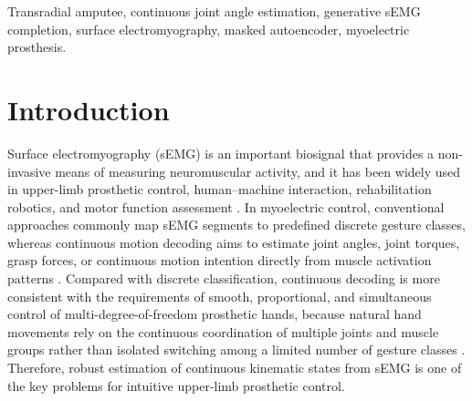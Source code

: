 \documentclass[journal]{IEEEtran}
\begin{document}
\begin{IEEEkeywords}
Transradial amputee, continuous joint angle estimation, generative sEMG completion, surface electromyography, masked autoencoder, myoelectric prosthesis.
\end{IEEEkeywords}

\IEEEpeerreviewmaketitle

\section{Introduction}

Surface electromyography (sEMG) is an important biosignal that provides a non-invasive means of measuring neuromuscular activity, and it has been widely used in upper-limb prosthetic control, human--machine interaction, rehabilitation robotics, and motor function assessment \cite{Zhong2026DeepFeature,Hudgins1993Strategy,Cipriani2011Online,Wei2024Continuous}. In myoelectric control, conventional approaches commonly map sEMG segments to predefined discrete gesture classes, whereas continuous motion decoding aims to estimate joint angles, joint torques, grasp forces, or continuous motion intention directly from muscle activation patterns \cite{Jiang2014Mapping,Jiang2014Intuitive,Zhang2020Simultaneous,Krasoulis2015Evaluation}. Compared with discrete classification, continuous decoding is more consistent with the requirements of smooth, proportional, and simultaneous control of multi-degree-of-freedom prosthetic hands, because natural hand movements rely on the continuous coordination of multiple joints and muscle groups rather than isolated switching among a limited number of gesture classes \cite{Jiang2014Intuitive,Xiloyannis2017Gaussian}. Therefore, robust estimation of continuous kinematic states from sEMG is one of the key problems for intuitive upper-limb prosthetic control.
\end{document}
